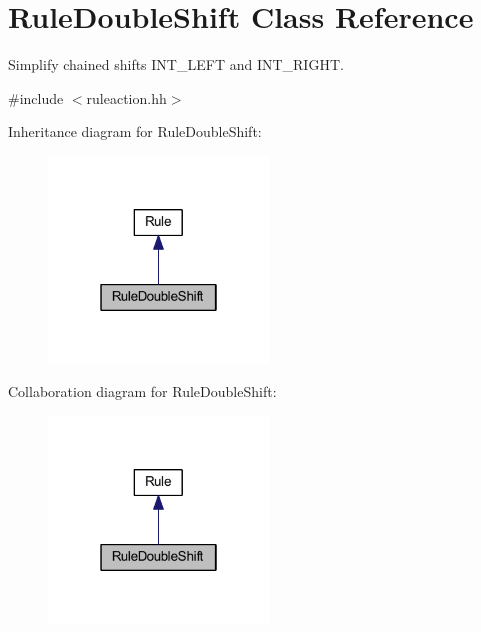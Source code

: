 \hypertarget{class_rule_double_shift}{}\section{Rule\+Double\+Shift Class Reference}
\label{class_rule_double_shift}


Simplify chained shifts I\+N\+T\+\_\+\+L\+E\+FT and I\+N\+T\+\_\+\+R\+I\+G\+HT.  




{\ttfamily \#include $<$ruleaction.\+hh$>$}



Inheritance diagram for Rule\+Double\+Shift\+:
\nopagebreak
\begin{figure}[H]
\begin{center}
\leavevmode
\includegraphics[width=166pt]{class_rule_double_shift__inherit__graph}
\end{center}
\end{figure}


Collaboration diagram for Rule\+Double\+Shift\+:
\nopagebreak
\begin{figure}[H]
\begin{center}
\leavevmode
\includegraphics[width=166pt]{class_rule_double_shift__coll__graph}
\end{center}
\end{figure}
